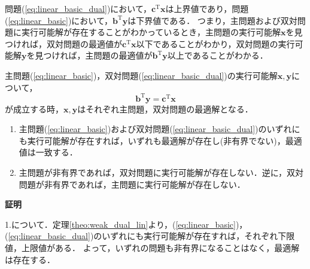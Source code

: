 \documentclass{jsreport}
\begin{document}
問題(\ref{eq:linear_basic_dual})において，$\bm{c}^{\mathrm{T}}\bm{x}$は上界値であり，問題(\ref{eq:linear_basic})において，$\bm{b}^{\mathrm{T}}\bm{y}$は下界値である．
つまり，主問題および双対問題に実行可能解が存在することがわかっているとき，主問題の実行可能解$\bm{x}$を見つければ，双対問題の最適値が$\bm{c}^{\mathrm{T}}\bm{x}$以下であることがわかり，双対問題の実行可能解$\bm{y}$を見つければ，主問題の最適値が$\bm{b}^{\mathrm{T}}\bm{y}$以上であることがわかる．

\begin{coro}
  主問題(\ref{eq:linear_basic})，双対問題(\ref{eq:linear_basic_dual})の実行可能解$\bm{x}, \bm{y}$について，
  \begin{equation}\label{eq:coro_dual}
    \bm{b}^{\mathrm{T}}\bm{y} = \bm{c}^{\mathrm{T}}\bm{x}
  \end{equation}
  が成立する時，$\bm{x}, \bm{y}$はそれぞれ主問題，双対問題の最適解となる．
\end{coro}

\begin{theo}\label{theo:strong_dual_lin}
  \begin{enumerate}
    \item 主問題(\ref{eq:linear_basic})および双対問題(\ref{eq:linear_basic_dual})のいずれにも実行可能解が存在すれば，いずれも最適解が存在し(非有界でない)，最適値は一致する．
    \item 主問題が非有界であれば，双対問題に実行可能解が存在しない．逆に，双対問題が非有界であれば，主問題に実行可能解が存在しない．
  \end{enumerate}
\end{theo}
\textbf{証明}

1.について．定理\ref{theo:weak_dual_lin}より，(\ref{eq:linear_basic})，(\ref{eq:linear_basic_dual})のいずれにも実行可能解が存在すれば，それぞれ下限値，上限値がある．
よって，いずれの問題も非有界になることはなく，最適解は存在する．
\end{document}
